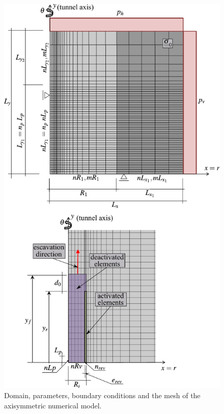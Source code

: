 \documentclass[Journal,letterpaper]{ascelike-new}
\begin{document}
\begin{figure}
	\centering
	\includegraphics[scale = 1.0]{malhaAXI.pdf}
	\caption{\label{malhaAXI}Domain, parameters, boundary conditions and the mesh of the axisymmetric numerical model.}
\end{figure}
\end{document}
